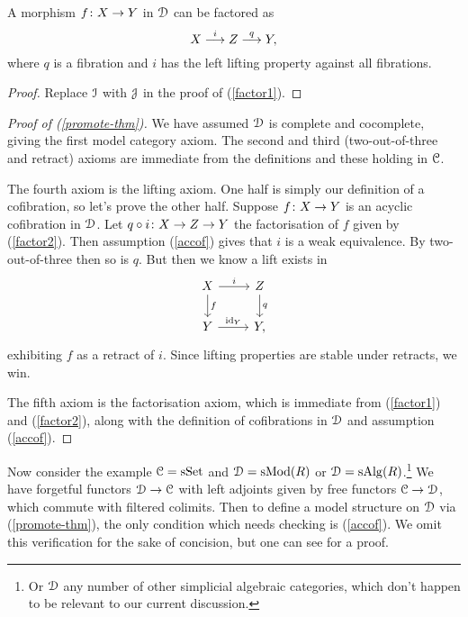 \begin{lemma}
  \label{factor2}
  A morphism $f \colon X \to Y$ in $\mathcal{D}$ can be factored as
  \[
  X \overset{i}{\longrightarrow} Z \overset{q}{\longrightarrow} Y,
  \]
  where $q$ is a fibration and $i$ has the left lifting property
  against all fibrations.
\end{lemma}

\begin{proof}
  Replace $\mathcal{I}$ with $\mathcal{J}$ in the proof of (\ref{factor1}).
\end{proof}


\begin{proof}[Proof of (\ref{promote-thm})]
  We have assumed $\mathcal{D}$ is complete and cocomplete, giving the first
  model category axiom. The second and third (two-out-of-three and
  retract) axioms are immediate from the definitions and these holding
  in $\mathcal{C}$.

  The fourth axiom is the lifting axiom. One half is simply our
  definition of a cofibration, so let's prove the other half. Suppose
  $f \colon X \to Y$ is an acyclic cofibration in $\mathcal{D}$. Let $q \circ i \colon X
  \to Z \to Y$ the factorisation of $f$ given by (\ref{factor2}). Then
  assumption (\ref{accof}) gives that $i$ is a weak equivalence. By
  two-out-of-three then so is $q$. But then we know a lift exists in
  \[
  \begin{tikzcd}
    X \rar{i} \dar{f} & Z \dar{q} \\ Y \rar{\id_Y} & Y,
  \end{tikzcd}
  \]
  exhibiting $f$ as a retract of $i$. Since lifting properties are
  stable under retracts, we win.

  The fifth axiom is the factorisation axiom, which is immediate from
  (\ref{factor1}) and (\ref{factor2}), along with the definition of
  cofibrations in $\mathcal{D}$ and assumption (\ref{accof}).
\end{proof}

\begin{nothing}
  \label{relevant-model}
  Now consider the example $\mathcal{C} = \mathrm{s}\mathrm{Set}$ and $\mathcal{D} = \mathrm{s}\mathrm{Mod}(R)$ or $\mathcal{D} =
  \mathrm{s}\mathrm{Alg}(R)$.\footnote{Or $\mathcal{D}$ any number of other simplicial
    algebraic categories, which don't happen to be relevant to our
    current discussion.}  We have forgetful functors $\mathcal{D} \to \mathcal{C}$ with
  left adjoints given by free functors $\mathcal{C} \to \mathcal{D}$, which commute with
  filtered colimits. Then to define a model structure on $\mathcal{D}$ via
  (\ref{promote-thm}), the only condition which needs checking is
  (\ref{accof}). We omit this verification for the sake of concision,
  but one can see \cite{goerssjardine} for a proof.
\end{nothing}

